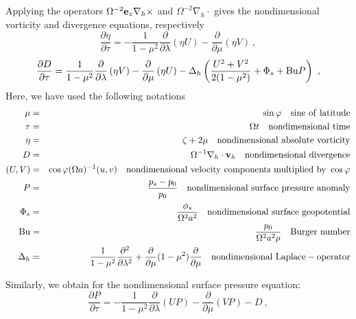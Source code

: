 Applying the operators $\Omega^{-2} {\bf e}_z \nabla_h \times$ and $\Omega^{-2} \nabla_h \cdot$ gives the nondimensional vorticity and divergence equations, respectively
{\setlength{\mathindent}{1em}
\begin{equation}
 \frac {\partial \eta } {\partial \tau} 
= - \frac 1 {1 - \mu^2} \frac {\partial } {\partial \lambda}
\left ( \eta U \right ) - \frac {\partial } {\partial \mu}
\left (\eta V \right)~,
\end{equation}
\begin{equation}
 \frac {\partial D} {\partial \tau} 
=  \frac 1 {1 - \mu^2} \frac {\partial } {\partial \lambda}
\left(\eta V \right ) - \frac {\partial } {\partial \mu}
\left (\eta U\right)
- \Delta_h \left(\frac {U^2 + V^2} {2 (1 - \mu^2)}+ \Phi_s + {\rm Bu} P \right)  ~,
\end{equation}
}
Here, we have used the following notations
{\setlength{\mathindent}{0em}
\begin{eqnarray}
\nonumber \mu & =& \sin \varphi ~~~{\rm sine~ of~ latitude} \\ \nonumber
\tau & = & \Omega t~~~{\rm nondimensional~ time} \\ \nonumber
\eta  & = & \zeta + 2 \mu   ~~~{\rm nondimensional~absolute~vorticity} \\ \nonumber
D & = & \Omega^{-1} \nabla_h \cdot {\bf v}_h~~~{\rm nondimensional~ divergence} \\ \nonumber  (U,V) & =& \cos\varphi (\Omega a)^{-1} (u,v)~~~{\rm nondimensional~ velocity~ components~multiplied~by~} \cos{\varphi}  \\ \nonumber 
P & = & \frac  {p_s-p_0} {p_0}~~~{\rm nondimensional~ surface~ pressure~ anomaly} \\ \nonumber  
\Phi_s & = & \frac {\phi_s} {\Omega^2 a^2}~~~{\rm nondimensional~surface~geopotential}\\ \nonumber
{\rm Bu} & = & \frac {p_0} {\Omega^2 a^2  \rho}~~~{\rm {\sc Burger} ~ number} \\ \nonumber
\Delta_h & = &  \displaystyle \frac 1 {1- \mu^2}  \frac {\partial^2 } {\partial \lambda^2} + \frac {\partial } {\partial \mu} (1 - \mu^2) 
\frac {\partial } {\partial \mu} ~~~{\rm nondimensional~{\sc Laplace}-operator}
\end{eqnarray}
} 

Similarly, we obtain for the nondimensional surface pressure equation:
\begin{equation}
 \frac {\partial P} {\partial \tau} 
= - \frac 1 {1 - \mu^2} \frac {\partial } {\partial \lambda}
\left(U P \right ) - \frac {\partial } {\partial \mu}
\left (V P \right)  - D~,
\end{equation}

